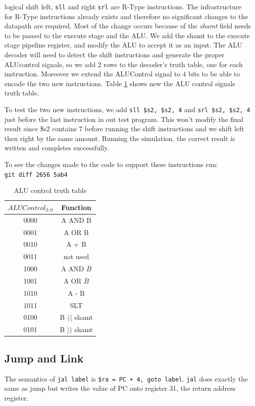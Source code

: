 \documentclass[titlepage,12pt,oneside,a4paper]{article}
\newcommand{\code}[1]{{\texttt{#1}}}
\begin{document}
logical shift left, \code{sll} and right \code{srl} are R-Type instructions. The infrastructure for R-Type instructions already exists and therefore no significant changes to the datapath are required. Most of the change occurs because of the \textit{shamt} field needs to be passed to the execute stage and the ALU. We add the shamt to the execute stage pipeline register, and modify the ALU to accept it as an input. The ALU decoder will need to detect the shift instructions and generate the proper ALUcontrol signals, so we add 2 rows to the decoder's truth table, one for each instruction. Moreover we extend the ALUControl signal to 4 bits to be able to encode the two new instructions. Table \ref{table:aluctrl} shows new the ALU control signals truth table.

To test the two new instructions, we add \code{sll \$s2, \$s2, 4} and \code{srl \$s2, \$s2, 4} just before the last instruction in out test program. This won't modify the final result since \$s2 contains 7 before running the shift instructions and we shift left then right by the same amount. Running the simulation, the correct result is written and completes successfully.

To see the changes made to the code to support these instructions run:\\
\code{git diff 2656 5ab4} 
\begin{table}
\begin{center}
	
	\begin{tabular}{|c|c|}
		\hline
		$ALUControl_{3:0}$ & Function \\
		\hline
		0000 & A AND B \\
		0001 & A OR B \\
		0010 & A + B \\
		0011 & not used \\
		1000 & A AND $\overline{B}$ \\
		1001 & A OR $\overline{B}$ \\
		1010 & A - B \\
		1011 & SLT \\
		0100 & B $\langle\langle$ shamt \\
		0101 & B $\rangle\rangle$ shamt \\
		\hline
	\end{tabular}
\end{center}
	\label{table:aluctrl}
	\caption{ALU control truth table}
\end{table}


\subsection{Jump and Link}
The semantics of \code{jal label} is \code{\$ra = PC + 4, goto label}. \code{jal} does exactly the same as jump but writes the value of PC onto register 31, the return address register.
\end{document}
